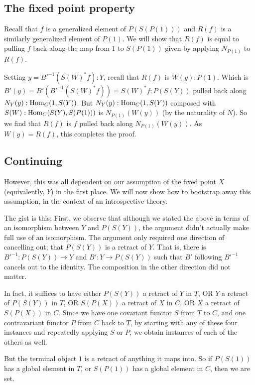 \subsection{The fixed point property}
Recall that $f$ is a generalized element of $P(S(P(1)))$ and $R(f)$ is a similarly generalized element of $P(1)$. We will show that $R(f)$ is equal to pulling $f$ back along the map from $1$ to $S(P(1))$ given by applying $N_{P(1)}$ to $R(f)$.

Setting $y = B'^{-1}(S(W)^* f) : Y$, recall that $R(f)$ is $W(y) : P(1)$. Which is $B'(y) = B'(B'^{-1}(S(W)^* f)) = S(W)^* f : P(S(Y))$ pulled back along $N_Y(y) : \operatorname{Hom}_C(1, S(Y))$. But $N_Y(y) : \operatorname{Hom}_C(1, S(Y))$ composed with $S(W) : \operatorname{Hom}_C(S(Y), S(P(1)))$ is $N_{P(1)}(W(y))$ (by the naturality of $N$). So we find that $R(f)$ is $f$ pulled back along $N_{P(1)}(W(y))$. As $W(y) = R(f)$, this completes the proof.

\subsection{Continuing}

However, this was all dependent on our assumption of the fixed point $X$ (equivalently, $Y$) in the first place. We will now show how to bootstrap away this assumption, in the context of an introspective theory. \TODO

The gist is this: First, we observe that although we stated the above in terms of an isomorphism between $Y$ and $P(S(Y))$, the argument didn't actually make full use of an isomorphism. The argument only required one direction of cancelling out; that $P(S(Y))$ is a retract of $Y$. That is, there is $B'^{-1} : P(S(Y)) \to Y$ and $B' : Y \to P(S(Y))$ such that $B'$ following $B'^{-1}$ cancels out to the identity. The composition in the other direction did not matter.

In fact, it suffices to have either $P(S(Y))$ a retract of $Y$ in $T$, OR $Y$ a retract of $P(S(Y))$ in $T$, OR $S(P(X))$ a retract of $X$ in $C$, OR $X$ a retract of $S(P(X))$ in $C$. Since we have one covariant functor $S$ from $T$ to $C$, and one contravariant functor $P$ from $C$ back to $T$, by starting with any of these four instances and repeatedly applying $S$ or $P$, we obtain instances of each of the others as well. 

But the terminal object $1$ is a retract of anything it maps into. So if $P(S(1))$ has a global element in $T$, or $S(P(1))$ has a global element in $C$, then we are set.


